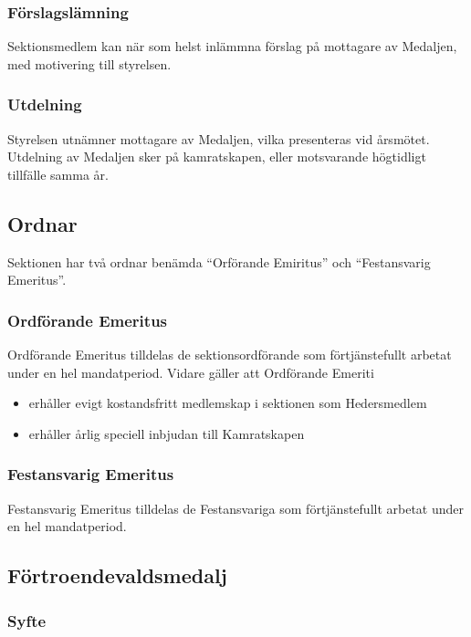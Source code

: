 \documentclass{../resources/dgovdoc}
\begin{document}
\subsubsection{Förslagslämning}

Sektionsmedlem kan när som helst inlämmna förslag på mottagare av Medaljen, med motivering till styrelsen. 

\subsubsection{Utdelning}

Styrelsen utnämner mottagare av Medaljen, vilka presenteras vid årsmötet. Utdelning av Medaljen sker på kamratskapen, eller motsvarande högtidligt tillfälle samma år. 

\subsection{Ordnar}

Sektionen har två ordnar benämda ``Orförande Emiritus'' och ``Festansvarig Emeritus''.

\subsubsection{Ordförande Emeritus}

Ordförande Emeritus tilldelas de sektionsordförande som förtjänstefullt arbetat under en hel mandatperiod. 
    Vidare gäller att Ordförande Emeriti
\begin{itemize}
\item erhåller evigt kostandsfritt medlemskap i sektionen som Hedersmedlem
\item erhåller årlig speciell inbjudan till Kamratskapen
\end{itemize}

\subsubsection{Festansvarig Emeritus}

Festansvarig Emeritus tilldelas de Festansvariga som förtjänstefullt arbetat under en hel mandatperiod.

\subsection{Förtroendevaldsmedalj}

\subsubsection{Syfte}
\end{document}
